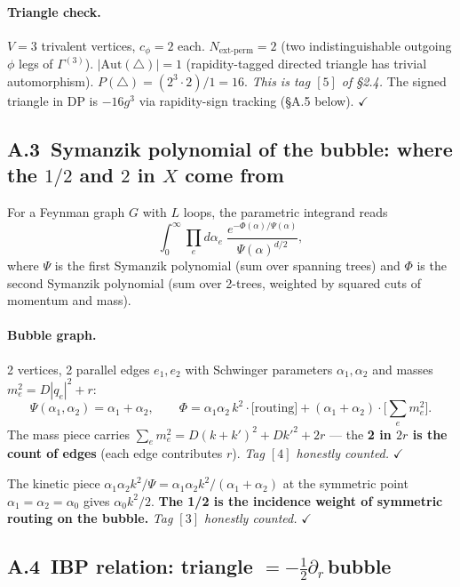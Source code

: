 \documentclass[11pt,a4paper]{article}
\newcommand{\ck}[1]{\textcolor{cntcol}{$[#1]$}}
\begin{document}
\paragraph{Triangle check.} $V = 3$ trivalent vertices, $c_{\phi}=2$ each.
$N_{\text{ext-perm}} = 2$ (two indistinguishable outgoing $\phi$ legs of $\Gamma^{(3)}$).
$|\mathrm{Aut}(\triangle)| = 1$ (rapidity-tagged directed triangle has trivial automorphism).
$P(\triangle) = (2^{3}\cdot 2)/1 = 16$. \emph{This is tag \ck{5} of \S 2.4.}
The signed triangle in DP is $-16 g^{3}$ via rapidity-sign tracking (\S A.5 below). $\checkmark$

\subsection*{A.3\ Symanzik polynomial of the bubble: where the $1/2$ and $2$ in $X$ come from}

For a Feynman graph $G$ with $L$ loops, the parametric integrand reads
\[
\int_{0}^{\infty}\!\!\!\prod_{e}d\alpha_{e}\;\frac{e^{-\Phi(\alpha)/\Psi(\alpha)}}{\Psi(\alpha)^{d/2}},
\]
where $\Psi$ is the first Symanzik polynomial (sum over spanning trees) and $\Phi$ is the
second Symanzik polynomial (sum over 2-trees, weighted by squared cuts of momentum and
mass).

\paragraph{Bubble graph.} 2 vertices, 2 parallel edges $e_{1}, e_{2}$ with Schwinger
parameters $\alpha_{1}, \alpha_{2}$ and masses $m_{e}^{2} = D|q_{e}|^{2} + r$:
\[
\Psi(\alpha_{1},\alpha_{2}) = \alpha_{1}+\alpha_{2}, \qquad
\Phi = \alpha_{1}\alpha_{2}\,k^{2} \cdot\bigl[\text{routing}\bigr] + (\alpha_{1}+\alpha_{2})\cdot\bigl[\sum_{e} m_{e}^{2}\bigr].
\]
The mass piece carries $\sum_{e} m_{e}^{2} = D(k+k')^{2} + Dk'^{2} + 2r$ — the
\textbf{2 in $2r$ is the count of edges} (each edge contributes $r$). \emph{Tag \ck{4}
honestly counted.} $\checkmark$

The kinetic piece $\alpha_{1}\alpha_{2}k^{2}/\Psi = \alpha_{1}\alpha_{2}k^{2}/(\alpha_{1}+\alpha_{2})$
at the symmetric point $\alpha_{1}=\alpha_{2}=\alpha_{0}$ gives $\alpha_{0}k^{2}/2$. \textbf{The 1/2 is the
incidence weight of symmetric routing on the bubble.} \emph{Tag \ck{3} honestly counted.}
$\checkmark$

\subsection*{A.4\ IBP relation: triangle $= -\tfrac{1}{2}\partial_{r}\,$bubble}
\end{document}

